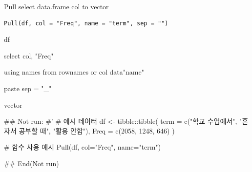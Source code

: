 \documentclass[a4paper]{book}
\begin{document}
%
\begin{Description}
Pull select data.frame col to vector
\end{Description}
%
\begin{Usage}
\begin{verbatim}
Pull(df, col = "Freq", name = "term", sep = "")
\end{verbatim}
\end{Usage}
%
\begin{Arguments}
\begin{ldescription}
\item[\code{df}] df

\item[\code{col}] select col, "Freq"

\item[\code{name}] using names from rownames or col data"name"

\item[\code{sep}] paste sep = "\_"
\end{ldescription}
\end{Arguments}
%
\begin{Value}
vector
\end{Value}
%
\begin{Examples}
\begin{ExampleCode}

\#\# Not run: 
#'
# 예시 데이터
df <- tibble::tibble(
  term = c("학교 수업에서", "혼자서 공부할 때", "활용 안함"),
  Freq = c(2058, 1248, 646)
)

# 함수 사용 예시
Pull(df, col="Freq", name="term")

## End(Not run)

\end{ExampleCode}
\end{Examples}
\end{document}
